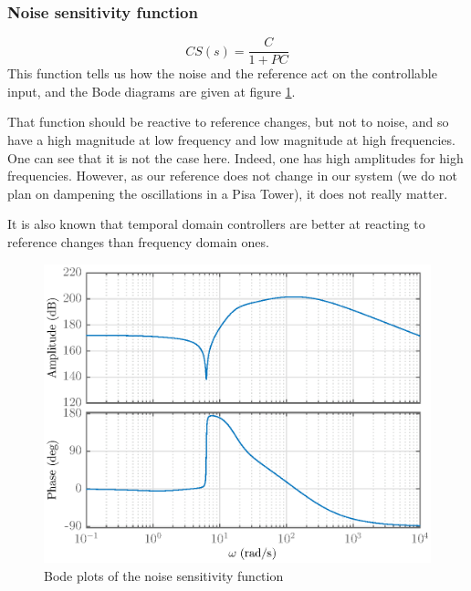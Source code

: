 \subsubsection{Noise sensitivity function}
$$
CS(s) = \dfrac{C}{1 + PC}
$$
This function tells us how the noise and the reference act on the controllable input, and the Bode diagrams are given at figure \ref{fig:noise-sensitivity}.\par
That function should be reactive to reference changes, but not to noise, and so have a high magnitude at low frequency and low magnitude at high frequencies. One can see that it is not the case here. Indeed, one has high amplitudes for high frequencies. However, as our reference does not change in our system (we do not plan on dampening the oscillations in a Pisa Tower), it does not really matter.\par
It is also known that temporal domain controllers are better at reacting to reference changes than frequency domain ones.
\begin{figure}[H]
    \centering
    \includegraphics[scale = 0.8]{resources/eps/4-Val/CS.eps}
    \caption{Bode plots of the noise sensitivity function}
    \label{fig:noise-sensitivity}
\end{figure}

